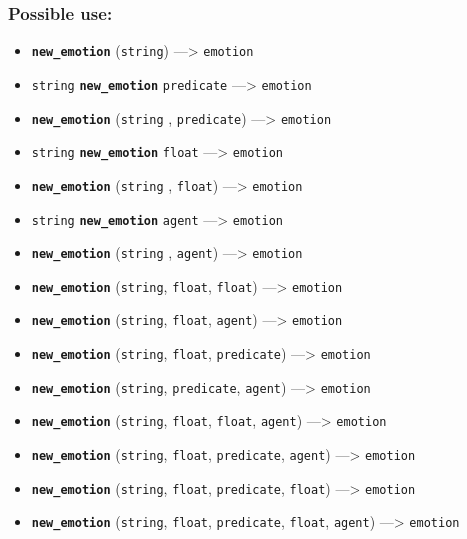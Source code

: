 \documentclass[]{book}
\providecommand{\tightlist}{%
  \setlength{\itemsep}{0pt}\setlength{\parskip}{0pt}}
\theoremstyle{definition}
\theoremstyle{definition}
\theoremstyle{definition}
\theoremstyle{remark}
\begin{document}
\subsubsection{Possible use:}\label{possible-use-368}

\begin{itemize}
\tightlist
\item
  \textbf{\texttt{new\_emotion}} (\texttt{string}) ---\textgreater{}
  \texttt{emotion}
\item
  \texttt{string} \textbf{\texttt{new\_emotion}} \texttt{predicate}
  ---\textgreater{} \texttt{emotion}
\item
  \textbf{\texttt{new\_emotion}} (\texttt{string} , \texttt{predicate})
  ---\textgreater{} \texttt{emotion}
\item
  \texttt{string} \textbf{\texttt{new\_emotion}} \texttt{float}
  ---\textgreater{} \texttt{emotion}
\item
  \textbf{\texttt{new\_emotion}} (\texttt{string} , \texttt{float})
  ---\textgreater{} \texttt{emotion}
\item
  \texttt{string} \textbf{\texttt{new\_emotion}} \texttt{agent}
  ---\textgreater{} \texttt{emotion}
\item
  \textbf{\texttt{new\_emotion}} (\texttt{string} , \texttt{agent})
  ---\textgreater{} \texttt{emotion}
\item
  \textbf{\texttt{new\_emotion}} (\texttt{string}, \texttt{float},
  \texttt{float}) ---\textgreater{} \texttt{emotion}
\item
  \textbf{\texttt{new\_emotion}} (\texttt{string}, \texttt{float},
  \texttt{agent}) ---\textgreater{} \texttt{emotion}
\item
  \textbf{\texttt{new\_emotion}} (\texttt{string}, \texttt{float},
  \texttt{predicate}) ---\textgreater{} \texttt{emotion}
\item
  \textbf{\texttt{new\_emotion}} (\texttt{string}, \texttt{predicate},
  \texttt{agent}) ---\textgreater{} \texttt{emotion}
\item
  \textbf{\texttt{new\_emotion}} (\texttt{string}, \texttt{float},
  \texttt{float}, \texttt{agent}) ---\textgreater{} \texttt{emotion}
\item
  \textbf{\texttt{new\_emotion}} (\texttt{string}, \texttt{float},
  \texttt{predicate}, \texttt{agent}) ---\textgreater{} \texttt{emotion}
\item
  \textbf{\texttt{new\_emotion}} (\texttt{string}, \texttt{float},
  \texttt{predicate}, \texttt{float}) ---\textgreater{} \texttt{emotion}
\item
  \textbf{\texttt{new\_emotion}} (\texttt{string}, \texttt{float},
  \texttt{predicate}, \texttt{float}, \texttt{agent}) ---\textgreater{}
  \texttt{emotion}
\end{itemize}
\end{document}
